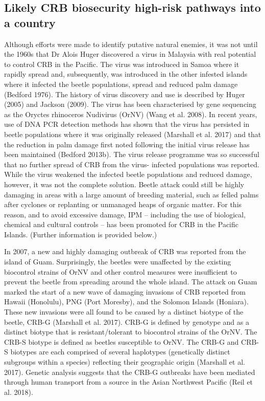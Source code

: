 \documentclass[twocolumn,letterpaper]{scrartcl}
\begin{document}
\subsection{Likely CRB biosecurity high-risk pathways into a country}

Although efforts were made to identify putative natural enemies, it was not until the 1960s that Dr Alois Huger 
discovered a virus in Malaysia with real potential to control CRB in the Pacific. The virus was introduced in 
Samoa where it rapidly spread and, subsequently, was introduced in the other infested islands where it infected 
the beetle populations, spread and reduced palm damage (Bedford 1976). The history of virus discovery and 
use is described by Huger (2005) and Jackson (2009). The virus has been characterised by gene sequencing as 
the Oryctes rhinoceros Nudivirus (OrNV) (Wang et al. 2008). In recent years, use of DNA PCR detection methods 
has shown that the virus has persisted in beetle populations where it was originally released (Marshall et al. 
2017) and that the reduction in palm damage first noted following the initial virus release has been maintained 
(Bedford 2013b). The virus release programme was so successful that no further spread of CRB from the virus-
infected populations was reported. While the virus weakened the infected beetle populations and reduced 
damage, however, it was not the complete solution. Beetle attack could still be highly damaging in areas with 
a large amount of breeding material, such as felled palms after cyclones or replanting or unmanaged heaps of 
organic matter. For this reason, and to avoid excessive damage, IPM – including the use of biological, chemical 
and cultural controls – has been promoted for CRB in the Pacific Islands. (Further information is provided below.)


In 2007, a new and highly damaging outbreak of CRB was reported from the island of Guam. Surprisingly, the 
beetles were unaffected by the existing biocontrol strains of OrNV and other control measures were insufficient 
to prevent the beetle from spreading around the whole island. The attack on Guam marked the start of a new 
wave of damaging invasions of CRB reported from Hawaii (Honolulu), PNG (Port Moresby), and the Solomon 
Islands (Honiara). These new invasions were all found to be caused by a distinct biotype of the beetle, CRB-G 
(Marshall  et  al.  2017).  CRB-G  is  defined  by  genotype  and  as  a  distinct  biotype  that  is  resistant/tolerant  to 
biocontrol strains of the OrNV. The CRB-S biotype is defined as beetles susceptible to OrNV. The CRB-G and 
CRB-S  biotypes  are  each  comprised  of  several  haplotypes  (genetically  distinct  subgroups  within  a  species) 
reflecting their geographic origin (Marshall et al. 2017). Genetic analysis suggests that the CRB-G outbreaks 
have been mediated through human transport from a source in the Asian Northwest Pacific (Reil et al. 2018).
\end{document}

